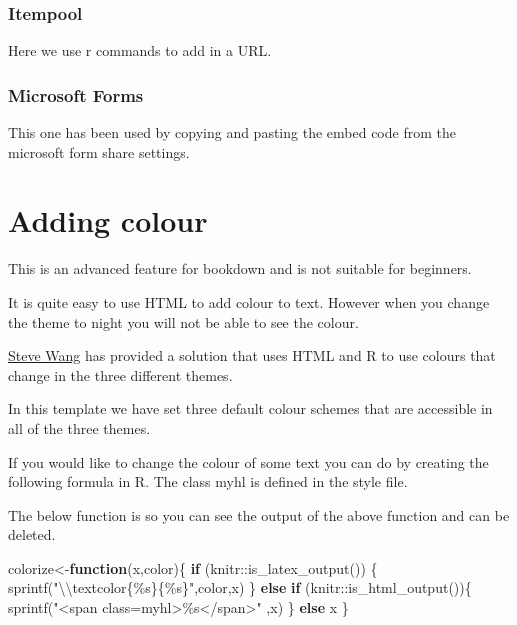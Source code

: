 \documentclass[
  letterpaper,
]{article}
\newenvironment{Shaded}{\begin{snugshade}}{\end{snugshade}}
\newcommand{\ControlFlowTok}[1]{\textcolor[rgb]{0.00,0.23,0.31}{\textbf{#1}}}
\newcommand{\FunctionTok}[1]{\textcolor[rgb]{0.28,0.35,0.67}{#1}}
\newcommand{\NormalTok}[1]{\textcolor[rgb]{0.00,0.23,0.31}{#1}}
\newcommand{\OtherTok}[1]{\textcolor[rgb]{0.00,0.23,0.31}{#1}}
\newcommand{\SpecialCharTok}[1]{\textcolor[rgb]{0.37,0.37,0.37}{#1}}
\newcommand{\StringTok}[1]{\textcolor[rgb]{0.13,0.47,0.30}{#1}}
\numberwithin{equation}{section}
\numberwithin{figure}{section}
\theoremstyle{break}
\begin{document}
\subsubsection{Itempool}\label{itempool}

Here we use r commands to add in a URL.

\subsubsection{Microsoft Forms}\label{microsoft-forms}

This one has been used by copying and pasting the embed code from the
microsoft form share settings.


\section{Adding colour}\label{adding-colour}

This is an advanced feature for bookdown and is not suitable for
beginners.

It is quite easy to use HTML to add {colour to text.} However when you
change the theme to night you will not be able to see the colour.

\href{https://www.nottingham.ac.uk/biosciences/people/qingqi.wang}{Steve
Wang} has provided a solution that uses HTML and R to use colours that
change in the three different themes.

In this template we have set three default colour schemes that are
accessible in all of the three themes.

If you would like to change the colour of some text you can do by
creating the following formula in R. The class myhl is defined in the
style file.

The below function is so you can see the output of the above function
and can be deleted.

\begin{Shaded}
\begin{Highlighting}[]
\NormalTok{colorize}\OtherTok{\textless{}{-}}\ControlFlowTok{function}\NormalTok{(x,color)\{}
  \ControlFlowTok{if}\NormalTok{ (knitr}\SpecialCharTok{::}\FunctionTok{is\_latex\_output}\NormalTok{()) \{}
    \FunctionTok{sprintf}\NormalTok{(}\StringTok{"}\SpecialCharTok{\textbackslash{}\textbackslash{}}\StringTok{textcolor\{\%s\}\{\%s\}"}\NormalTok{,color,x)}
\NormalTok{  \} }\ControlFlowTok{else} \ControlFlowTok{if}\NormalTok{ (knitr}\SpecialCharTok{::}\FunctionTok{is\_html\_output}\NormalTok{())\{}
    \FunctionTok{sprintf}\NormalTok{(}\StringTok{"\textless{}span class=\textquotesingle{}myhl\textquotesingle{}\textgreater{}\%s\textless{}/span\textgreater{}"}\NormalTok{ ,x)}
\NormalTok{  \} }\ControlFlowTok{else}\NormalTok{ x}
\NormalTok{\}}
\end{Highlighting}
\end{Shaded}
\end{document}

